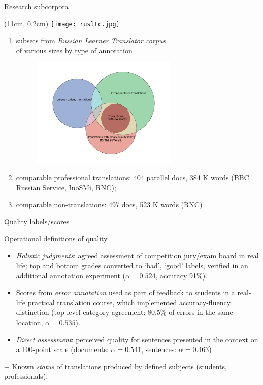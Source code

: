 \documentclass[11pt]{beamer} %
\begin{document}
\begin{frame}[plain]{Research subcorpora}
	\vspace{0.3em}
	\begin{textblock*}{2cm}(11cm, 0.2cm) %
		\texttt{[image: rusltc.jpg]}
	\end{textblock*}
	\begin{enumerate}
		\item subsets from \textit{Russian Learner Translator corpus} \\of various sizes by type of annotation
		\begin{figure}
			\includegraphics[width=70mm]{subsets}
		\end{figure}
		\item comparable professional translations: 404 parallel docs, 384 K words (BBC Russian Service, InoSMi, RNC);
		\item comparable non-translations: 497 docs, 523 K words (RNC)
	\end{enumerate}
	
\end{frame}

\begin{frame}{Quality labels/scores}

	Operational definitions of quality
	\begin{itemize}
		\item \textit{Holistic judgments}: agreed assessment of competition jury/exam board in real life; top and bottom grades converted to `bad', `good' labels, verified in an additional annotation experiment ($\alpha=0.524$, accuracy 91\%).
		\item Scores from \textit{error annotation} used as part of feedback to students in a real-life practical translation course, which implemented accuracy-fluency distinction (top-level category agreement: 80.5\% of errors in the same location, $\alpha=0.535$).
		\item \textit{Direct assessment}: perceived quality for sentences presented in the context on a 100-point scale (documents: $\alpha=0.541$, sentences: $\alpha=0.463$)
	\end{itemize} 
+ Known \textit{status} of translations produced by defined subjects (students, professionals).	
\end{frame}
\end{document}
